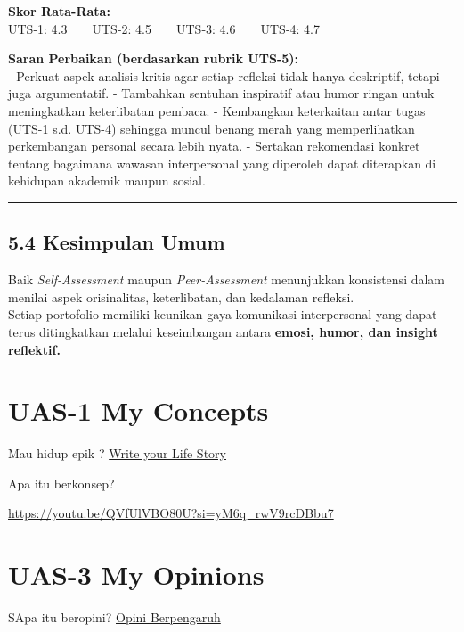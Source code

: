 \documentclass[
  letterpaper,
  DIV=11,
  numbers=noendperiod]{scrreprt}
\begin{document}
\textbf{Skor Rata-Rata:}\\
UTS-1: 4.3 \textbar{} UTS-2: 4.5 \textbar{} UTS-3: 4.6 \textbar{} UTS-4:
4.7

\textbf{Saran Perbaikan (berdasarkan rubrik UTS-5):}\\
- Perkuat aspek analisis kritis agar setiap refleksi tidak hanya
deskriptif, tetapi juga argumentatif. - Tambahkan sentuhan inspiratif
atau humor ringan untuk meningkatkan keterlibatan pembaca. - Kembangkan
keterkaitan antar tugas (UTS-1 s.d. UTS-4) sehingga muncul benang merah
yang memperlihatkan perkembangan personal secara lebih nyata. - Sertakan
rekomendasi konkret tentang bagaimana wawasan interpersonal yang
diperoleh dapat diterapkan di kehidupan akademik maupun sosial.

\begin{center}\rule{0.5\linewidth}{0.5pt}\end{center}

\section{5.4 Kesimpulan Umum}\label{kesimpulan-umum}

Baik \emph{Self-Assessment} maupun \emph{Peer-Assessment} menunjukkan
konsistensi dalam menilai aspek orisinalitas, keterlibatan, dan
kedalaman refleksi.\\
Setiap portofolio memiliki keunikan gaya komunikasi interpersonal yang
dapat terus ditingkatkan melalui keseimbangan antara \textbf{emosi,
humor, dan insight reflektif.}


\chapter{UAS-1 My Concepts}\label{uas-1-my-concepts}

Mau hidup epik ? \href{lifestory.pdf}{Write your Life Story}

Apa itu berkonsep?

\url{https://youtu.be/QVfUlVBO80U?si=yM6q_rwV9rcDBbu7}


\chapter{UAS-3 My Opinions}\label{uas-3-my-opinions}

SApa itu beropini? \href{BM\%20Opini.mp4}{Opini Berpengaruh}
\end{document}
